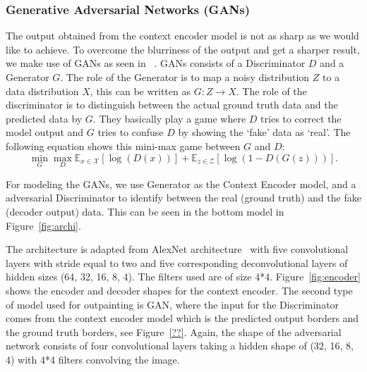\documentclass{sig-alternate}
\begin{document}
\subsubsection{Generative Adversarial Networks (GANs)}

The output obtained from the context encoder model is not as sharp as we would like to achieve. To overcome the blurriness of the output and get a sharper result, we make use of GANs as seen in ~\cite{goodfellow2014:generative}. GANs consists of a Discriminator $D$ and a Generator $G$. The role of the Generator is to map a noisy distribution $Z$ to a data distribution $X$, this can be written as $G: Z \rightarrow X$. The role of the discriminator is to distinguish between the actual ground truth data and the predicted data by $G$. They basically play a game where $D$ tries to correct the model output and $G$ tries to confuse $D$ by showing the `fake' data as `real'. The following equation shows this mini-max game between $G$ and $D$:
\begin{equation}
	\min_{G}\max_{D}\mathbb{E}_{x\in\mathcal{X}}[\log(D(x))]+\mathbb{E}_{z\in\mathcal{Z}}[\log(1-D(G(z)))].
\end{equation}

For modeling the GANs, we use Generator as the Context Encoder model, and a adversarial Discriminator to identify between the real (ground truth) and the fake (decoder output) data. This can be seen in the bottom model in Figure~\ref{fig:archi}.

The architecture is adapted from AlexNet architecture~\cite{krizhevsky2012imagenet} with five convolutional layers with stride equal to two and five corresponding deconvolutional layers of hidden sizes (64, 32, 16, 8, 4). The filters used are of size 4*4. Figure~\ref{fig:encoder} shows the encoder and decoder shapes for the context encoder. The second type of model used for outpainting is GAN, where the input for the Discriminator comes from the context encoder model which is the predicted output borders and the ground truth borders, see Figure~\ref{??}. Again, the shape of the adversarial network consists of four convolutional layers taking a hidden shape of (32, 16, 8, 4) with 4*4 filters convolving the image.
\end{document}
